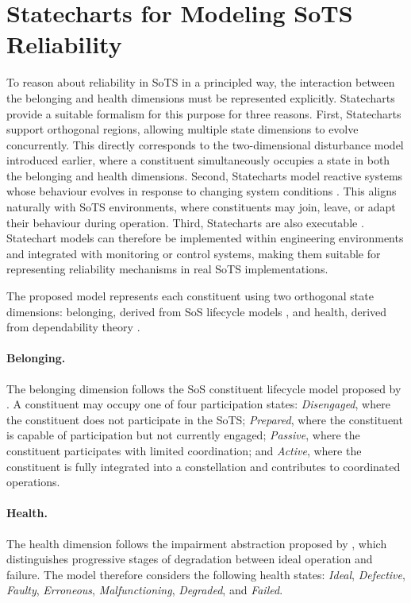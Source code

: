 \section{Statecharts for Modeling SoTS Reliability}\label{sec:statecharts-reliability}
To reason about reliability in SoTS in a principled way, the interaction between the belonging and health dimensions must be represented explicitly. Statecharts \cite{harel1987statecharts} provide a suitable formalism for this purpose for three reasons.  First, Statecharts support orthogonal regions, allowing multiple state dimensions to evolve concurrently. This directly corresponds to the two-dimensional disturbance model introduced earlier, where a constituent simultaneously occupies a state in both the belonging and health dimensions. Second, Statecharts model reactive systems whose behaviour evolves in response to changing system conditions \cite{harel1998modeling}. This aligns naturally with SoTS environments, where constituents may join, leave, or adapt their behaviour during operation. Third, Statecharts are also executable \cite{harel1996executable}. Statechart models can therefore be implemented within engineering environments and integrated with monitoring or control systems, making them suitable for representing reliability mechanisms in real SoTS implementations.

The proposed model represents each constituent using two orthogonal state dimensions: belonging, derived from SoS lifecycle models \cite{axelsson2019refined}, and health, derived from dependability theory \cite{parhami1994multi}.

\paragraph{Belonging.}
The belonging dimension follows the SoS constituent lifecycle model proposed by \citet{axelsson2019refined}. A constituent may occupy one of four participation states: \textit{Disengaged}, where the constituent does not participate in the SoTS; \textit{Prepared}, where the constituent is capable of participation but not currently engaged; \textit{Passive}, where the constituent participates with limited coordination; and \textit{Active}, where the constituent is fully integrated into a constellation and contributes to coordinated operations.

\paragraph{Health.}
The health dimension follows the impairment abstraction proposed by \citet{parhami1994multi}, which distinguishes progressive stages of degradation between ideal operation and failure. The model therefore considers the following health states: \textit{Ideal}, \textit{Defective}, \textit{Faulty}, \textit{Erroneous}, \textit{Malfunctioning}, \textit{Degraded}, and \textit{Failed}.


